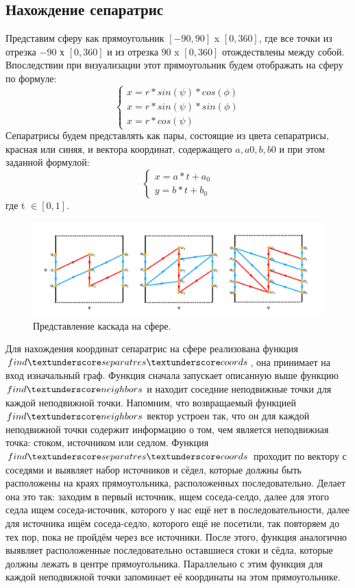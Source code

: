 	\subsection{Нахождение сепаратрис}
	\hspace{0.5 cm} Представим сферу как прямоугольник $[-90, 90]$ x $[0, 360]$, где все точки из отрезка $-90$ х $[0, 360]$ и из отрезка $90$ x $[0, 360]$ отождествлены между собой. Впоследствии при визуализации этот прямоугольник будем отображать на сферу по формуле:
	$$ \begin{cases}
		x = r * sin(\psi) * cos(\phi)\\
		x = r * sin(\psi) * sin(\phi)\\
		x = r * cos(\psi)
	\end{cases} $$ Сепаратрисы будем представлять как пары, состоящие из цвета сепаратрисы, красная или синяя, и вектора координат, содержащего $a, a0, b, b0$ и при этом заданной формулой:
	$$ \begin{cases}
		x = a * t + a_0\\
		y = b * t + b_0
	\end{cases} $$ где t $\in [0, 1]$.
	\begin{figure}[h]
		\centering
		\includegraphics[width=\textwidth]{Projections.png}
		\caption{Представление каскада на сфере. \label{overflow}}
	\end{figure}
	\par Для нахождения координат сепаратрис на сфере реализована функция \\ $find \textunderscore separatres \textunderscore coords$, она принимает на вход изначальный граф. Функция сначала запускает описанную выше функцию $find \textunderscore neighbors$ и находит соседние неподвижные точки для каждой неподвижной точки. Напомним, что возвращаемый функцией $find \textunderscore neighbors$ вектор устроен так, что он для каждой неподвижной точки содержит информацию о том, чем является неподвижная точка: стоком, источником или седлом. Функция $find \textunderscore separatres \textunderscore coords$ проходит по вектору с соседями и выявляет набор источников и сёдел, которые должны быть расположены на краях прямоугольника, расположенных последовательно. Делает она это так: заходим в первый источник, ищем соседа-селдо, далее для этого седла ищем соседа-источник, которого у нас ещё нет в последовательности, далее для источника ищём соседа-седло, которого ещё не посетили, так повторяем до тех пор, пока не пройдём через все источники. После этого, функция аналогично выявляет расположенные последовательно оставшиеся стоки и сёдла, которые должны лежать в центре прямоугольника. Параллельно с этим функция для каждой неподвижной точки запоминает её координаты на этом прямоугольнике.
